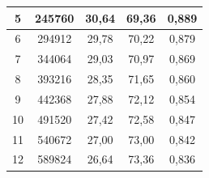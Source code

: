 \begin{table}[]
{\begin{tabular}{ccccc}
			5                 & 245760                                                                 & 30,64                                                                        & 69,36                                                                             & 0,889                   \\ \hline
			6                 & 294912                                                                 & 29,78                                                                        & 70,22                                                                             & 0,879                   \\ \hline
			7                 & 344064                                                                 & 29,03                                                                        & 70,97                                                                             & 0,869                   \\ \hline
			8                 & 393216                                                                 & 28,35                                                                        & 71,65                                                                             & 0,860                   \\ \hline
			9                 & 442368                                                                 & 27,88                                                                        & 72,12                                                                             & 0,854                   \\ \hline
			10                & 491520                                                                 & 27,42                                                                        & 72,58                                                                             & 0,847                   \\ \hline
			11                & 540672                                                                 & 27,00                                                                        & 73,00                                                                             & 0,842                   \\ \hline
			12                & 589824                                                                 & 26,64                                                                        & 73,36                                                                             & 0,836                   \\ \hline

\end{tabular}}
\end{table}
